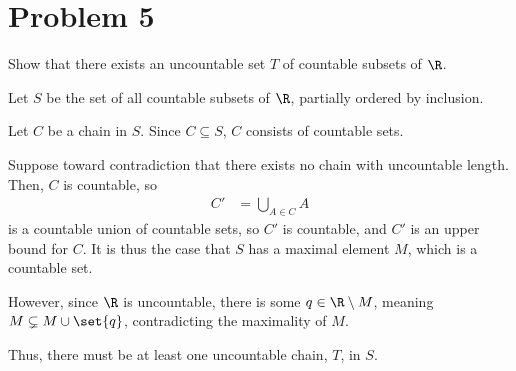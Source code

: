 \documentclass[12pt]{mypackage}
\begin{document}
\section{Problem 5}%
\begin{problem}
  Show that there exists an uncountable set $T$ of countable subsets of $\R$.
\end{problem}
\begin{solution}
  Let $S$ be the set of all countable subsets of $\R$, partially ordered by inclusion.\newline

  Let $C$ be a chain in $S$. Since $C\subseteq S$, $C$ consists of countable sets.\newline

  Suppose toward contradiction that there exists no chain with uncountable length. Then, $C$ is countable, so
  \begin{align*}
    C' &= \bigcup_{A\in C}A
  \end{align*}
  is a countable union of countable sets, so $C'$ is countable, and $C'$ is an upper bound for $C$. It is thus the case that $S$ has a maximal element $M$, which is a countable set.\newline

  However, since $\R$ is uncountable, there is some $q\in \R\setminus M$, meaning $M\subsetneq M\cup \set{q}$, contradicting the maximality of $M$.\newline

  Thus, there must be at least one uncountable chain, $T$, in $S$.
\end{solution}
\end{document}
